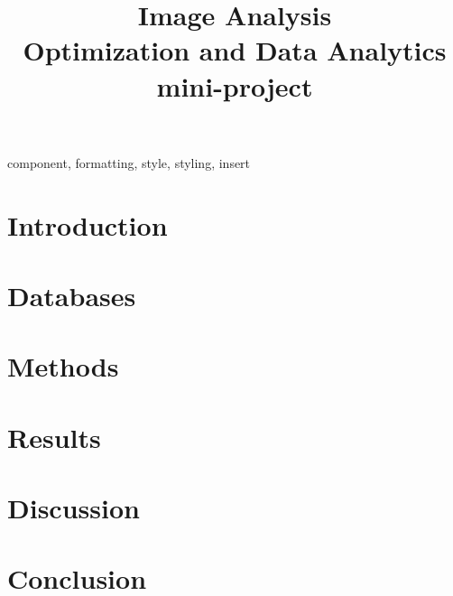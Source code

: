 \documentclass[conference]{IEEEtran}
\begin{document}
\title{Image Analysis\\
{\footnotesize Optimization and Data Analytics mini-project}}

\author{
}

\maketitle

\begin{abstract}
\end{abstract}

\begin{IEEEkeywords}
component, formatting, style, styling, insert
\end{IEEEkeywords}

\section{Introduction}


\section{Databases}


\section{Methods}


\section{Results}


\section{Discussion}


\section{Conclusion}


\onecolumn
\newpage

\listoftodos[Notes]
\end{document}
